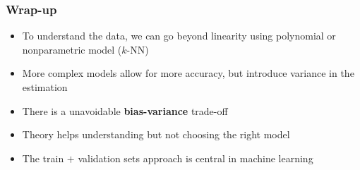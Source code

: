\documentclass[xcolor=x11names,compress, aspectratio=169]{beamer}
\renewcommand{\(}{\begin{columns}}
\renewcommand{\)}{\end{columns}}
\newcommand{\<}[1]{\begin{column}{#1}}
\renewcommand{\>}{\end{column}}
\begin{document}
\begin{frame}
\frametitle{\textcolor{brique}{ Wrap-up }}
\pause
\begin{itemize}[<+->]
\item To understand the data, we can go beyond linearity using polynomial or nonparametric model ($k$-NN)
\item More complex models allow for more accuracy, but introduce variance in the estimation
\item  There is a unavoidable  \textbf{bias-variance} trade-off
\item Theory helps understanding but not choosing the right model
\item The train $+$ validation sets approach is central in machine learning%
\end{itemize}
\end{frame}
\end{document}
